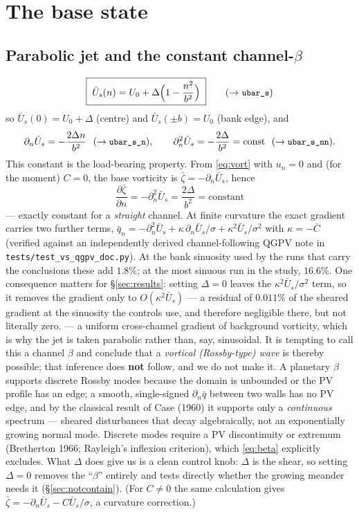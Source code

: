 \documentclass[11pt]{article}
\newcommand{\un}{u_n}
\newcommand{\Us}{\bar U_s}
\newcommand{\dn}{\partial_n}
\newcommand{\code}[1]{\texttt{\small #1}}
\begin{document}
\section{The base state}
\label{sec:base}

\subsection{Parabolic jet and the constant channel-$\beta$}
\begin{equation}
  \boxed{\;\Us(n)=U_0+\Delta\Big(1-\frac{n^{2}}{b^{2}}\Big)\;}
  \tag{$\to$ \code{ubar\_s}}
\end{equation}
so $\Us(0)=U_0+\Delta$ (centre) and $\Us(\pm b)=U_0$ (bank edge), and
\begin{equation}
  \dn\Us=-\frac{2\Delta n}{b^{2}}\ \ (\to\code{ubar\_s\_n}),\qquad
  \dn^{2}\Us=-\frac{2\Delta}{b^{2}}=\text{const}\ \ (\to\code{ubar\_s\_nn}).
\end{equation}
This constant is the load-bearing property. From \eqref{eq:vort} with $\un=0$ and
(for the moment) $C=0$, the base vorticity is $\bar\zeta=-\dn\Us$, hence
\begin{equation}
  \boxed{\;\frac{\partial\bar\zeta}{\partial n}=-\dn^{2}\Us=\frac{2\Delta}{b^{2}}
  =\text{constant}\;}
  \label{eq:beta}
\end{equation}
--- exactly constant for a \emph{straight} channel. At finite curvature the exact
gradient carries two further terms, $\bar q_n=-\dn^2\Us+\kappa\,\dn\Us/\sigma
+\kappa^{2}\Us/\sigma^{2}$ with $\kappa=-\bar C$ (verified against an independently
derived channel-following QGPV note in \code{tests/test\_vs\_qgpv\_doc.py}). At the bank
sinuosity used by the runs that carry the conclusions these add $1.8\%$; at the most
sinuous run in the study, $16.6\%$. One consequence matters for \S\ref{sec:results}:
setting $\Delta=0$ leaves the $\kappa^{2}\Us/\sigma^{2}$ term, so it removes the
gradient only to $O(\kappa^{2}\Us)$ --- a residual of $0.011\%$ of the sheared gradient
at the sinuosity the controls use, and therefore negligible there, but not literally zero.
--- a uniform cross-channel gradient of background vorticity, which is why the jet is
taken parabolic rather than, say, sinusoidal. It is tempting to call this a channel
$\beta$ and conclude that a \emph{vortical (Rossby-type) wave} is thereby possible;
that inference does \textbf{not} follow, and we do not make it. A planetary $\beta$
supports discrete Rossby modes because the domain is unbounded or the PV profile has
an edge; a smooth, single-signed $\dn\bar q$ between two walls has no PV edge, and by
the classical result of Case (1960) it supports only a \emph{continuous} spectrum ---
sheared disturbances that decay algebraically, not an exponentially growing normal
mode. Discrete modes require a PV discontinuity or extremum (Bretherton 1966;
Rayleigh's inflexion criterion), which \eqref{eq:beta} explicitly excludes. What
$\Delta$ does give us is a clean control knob: $\Delta$ is the shear, so setting
$\Delta=0$ removes the ``$\beta$'' entirely and tests directly whether the growing
meander needs it (\S\ref{sec:notcontain}). (For $C\neq0$ the same calculation gives
$\bar\zeta=-\dn\Us-C\Us/\sigma$, a curvature correction.)
\end{document}
